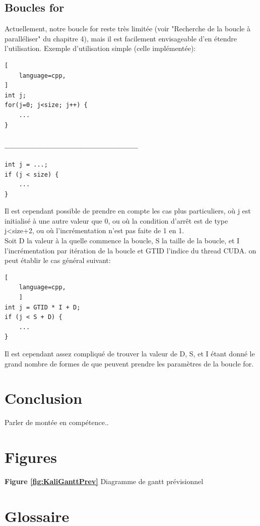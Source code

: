 \documentclass{article}
\begin{document}
	
	\subsection{Boucles for}
	
	Actuellement, notre boucle for reste très limitée (voir "Recherche de la boucle à paralléliser" du chapitre 4), mais il est facilement envisageable d'en étendre l'utilisation.
	Exemple d'utilisation simple (celle implémentée):
			\begin{lstlisting}[
    language=cpp,
]
int j;
for(j=0; j<size; j++) {
	...
}

_____________________________________

int j = ...;
if (j < size) {
	...
}
	\end{lstlisting}
	Il est cependant possible de prendre en compte les cas plus particuliers, où j est initialisé à une autre valeur que 0, ou où la condition d'arrêt est de type j\textless size+2, ou où l'incrémentation n'est pas faite de 1 en 1.
	\\Soit D la valeur à la quelle commence la boucle, S la taille de la boucle, et I l'incrémentation par itération de la boucle et GTID l'indice du thread CUDA. on peut établir le cas général suivant:
	\begin{lstlisting}[
    language=cpp,
    ]
int j = GTID * I + D;
if (j < S + D) {
	...
}
	\end{lstlisting}
	
	Il est cependant assez compliqué de trouver la valeur de D, S, et I étant donné le grand nombre de formes de que peuvent prendre les paramètres de la boucle for.

	\section{Conclusion}
	
	Parler de montée en compétence..
	
	
	\section*{Figures}
\indent
\textbf{Figure \ref{fig:KaliGanttPrev}} Diagramme de gantt prévisionnel\\
\indent


\section*{Glossaire}
\renewcommand{\glossarysection}[2][]{}
\end{document}
